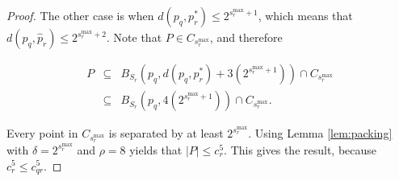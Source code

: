 \begin{proof}








The other case is when $d(p_q, p_r^*) \le 2^{s_r^{\max} + 1}$, which means that
$d(p_q, \hat{p}_r) \le 2^{s_r^{\max} + 2}$. %
Note that $P \in C_{s_r^{\max}}$, and therefore

\begin{eqnarray}
P &\subseteq& B_{S_r}(p_q, d(p_q, p_r^*) + 3(2^{s_r^{\max} + 1})) \cap
C_{s_r^{\max}} \\
 &\subseteq& B_{S_r}(p_q, 4(2^{s_r^{\max} + 1})) \cap C_{s_r^{\max}}.
\end{eqnarray}

Every point in $C_{s_r^{\max}}$ is separated by at least $2^{s_r^{\max}}$.
Using Lemma \ref{lem:packing} with $\delta = 2^{s_r^{\max}}$ and $\rho = 8$
yields that $|P| \le c_r^5$.  This gives the result, because $c_r^5 \le
c_{qr}^5$.
\end{proof}

